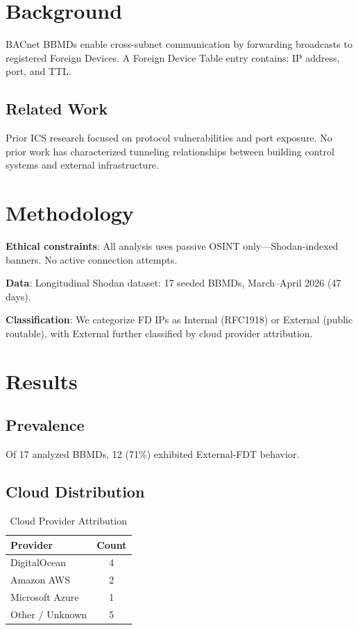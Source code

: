 \documentclass[11pt,a4paper]{article}
\begin{document}
\section{Background}
\label{sec:background}

BACnet BBMDs enable cross-subnet communication by forwarding broadcasts to 
registered Foreign Devices. A Foreign Device Table entry contains: IP address, 
port, and TTL.

\subsection{Related Work}

Prior ICS research focused on protocol vulnerabilities and port exposure. No 
prior work has characterized tunneling relationships between building control 
systems and external infrastructure.

\section{Methodology}
\label{sec:methodology}

\textbf{Ethical constraints}: All analysis uses passive OSINT only---Shodan-indexed 
banners. No active connection attempts.

\textbf{Data}: Longitudinal Shodan dataset: 17 seeded BBMDs, March--April 2026 (47 days).

\textbf{Classification}: We categorize FD IPs as Internal (RFC1918) or External 
(public routable), with External further classified by cloud provider attribution.

\section{Results}
\label{sec:results}

\subsection{Prevalence}

Of 17 analyzed BBMDs, 12 (71\%) exhibited External-FDT behavior.

\subsection{Cloud Distribution}

\begin{table}[h]
\centering
\begin{tabular}{lc}
\toprule
\textbf{Provider} & \textbf{Count} \\
\midrule
DigitalOcean & 4 \\
Amazon AWS & 2 \\
Microsoft Azure & 1 \\
Other / Unknown & 5 \\
\bottomrule
\end{tabular}
\caption{Cloud Provider Attribution}
\label{tab:clouds}
\end{table}
\end{document}
